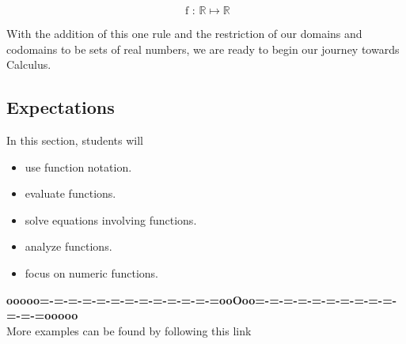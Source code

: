 \documentclass{ximera}
\begin{document}
\[
\text{ f : } \mathbb{R} \mapsto \mathbb{R}
\]





With the addition of this one rule and the restriction of our domains and codomains to be sets of real numbers, we are ready to begin our journey towards Calculus.








\subsection{Expectations}


\begin{sectionOutcomes}
In this section, students will 

\begin{itemize}
\item use function notation.
\item evaluate functions.
\item solve equations involving functions.
\item analyze functions.
\item focus on numeric functions.
\end{itemize}
\end{sectionOutcomes}







\begin{center}
\textbf{\textcolor{green!50!black}{ooooo=-=-=-=-=-=-=-=-=-=-=-=-=ooOoo=-=-=-=-=-=-=-=-=-=-=-=-=ooooo}} \\

More examples can be found by following this link\\ 

\end{center}
\end{document}
